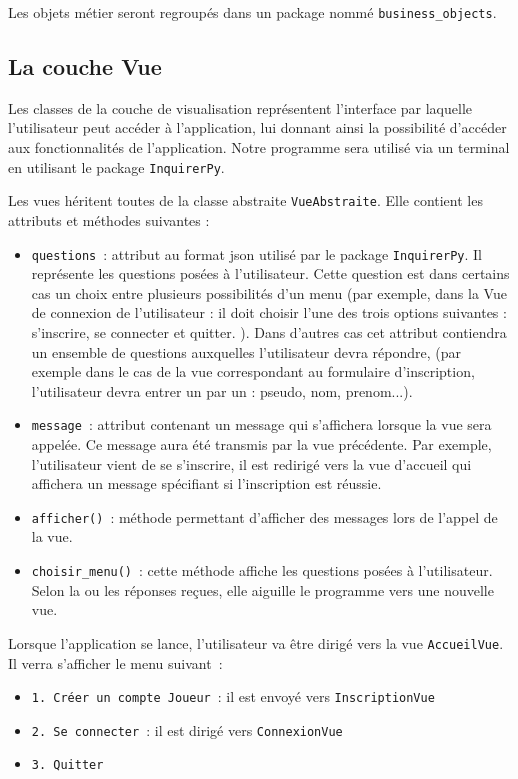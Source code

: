 \documentclass[11pt]{article}
\begin{document}
\bigbreak

Les objets métier seront regroupés dans un package nommé \texttt{business\_objects}.

\subsection{La couche Vue}

Les classes de la couche de visualisation représentent l'interface par laquelle l'utilisateur peut accéder à l'application, lui donnant ainsi la possibilité d'accéder aux fonctionnalités de l'application. Notre programme sera utilisé via un terminal en utilisant le package \texttt{InquirerPy}.
\bigbreak

Les vues héritent toutes de la classe abstraite \texttt{VueAbstraite}. Elle contient les attributs et méthodes suivantes :
\begin{itemize}
    \item \texttt{questions}~: attribut au format json utilisé par le package \texttt{InquirerPy}. Il représente les questions posées à l'utilisateur. Cette question est dans certains cas un choix entre plusieurs possibilités d'un menu (par exemple, dans la Vue de connexion de l'utilisateur : il doit choisir l'une des trois options suivantes : s'inscrire, se connecter et quitter. ). Dans d'autres cas cet attribut contiendra un ensemble de questions auxquelles l'utilisateur devra répondre,  (par exemple dans le cas de la vue correspondant au formulaire d'inscription, l'utilisateur devra entrer un par un : pseudo, nom, prenom...).
    \item \texttt{message}~: attribut contenant un message qui s'affichera lorsque la vue sera appelée. Ce message aura été transmis par la vue précédente. Par exemple, l'utilisateur vient de se s'inscrire, il est redirigé vers la vue d'accueil qui affichera un message spécifiant si l'inscription est réussie.
    \item \texttt{afficher()}~: méthode permettant d'afficher des messages lors de l'appel de la vue.
    \item \texttt{choisir\_menu()}~: cette méthode affiche les questions posées à l'utilisateur. Selon la ou les réponses reçues, elle aiguille le programme vers une nouvelle vue.
\end{itemize}

\bigbreak

Lorsque l'application se lance, l'utilisateur va être dirigé vers la vue \texttt{AccueilVue}. Il verra s'afficher le menu suivant~:
\begin{itemize}[label=, font=\small]
    \item \texttt{1. Créer un compte Joueur}~: il est envoyé vers \texttt{InscriptionVue}
    \item \texttt{2. Se connecter}~: il est dirigé vers \texttt{ConnexionVue}
    \item \texttt{3. Quitter}
\end{itemize}
\end{document}
